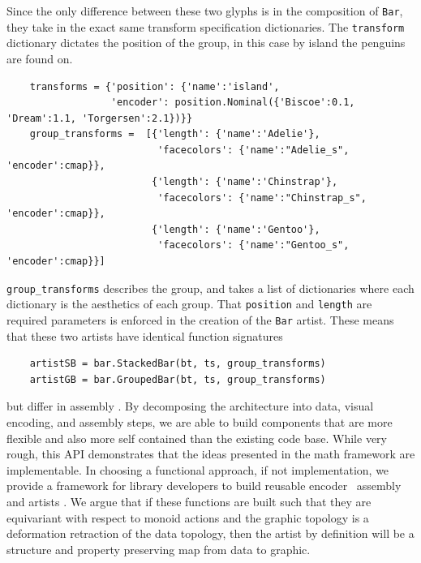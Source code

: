 \documentclass[../main.tex]{subfiles}
\begin{document}
Since the only difference between these two glyphs is in the composition of \texttt{Bar}, they take in the exact same transform specification dictionaries. The \texttt{transform} dictionary dictates the position of the group, in this case by island the penguins are found on.

\begin{verbatim}
    transforms = {'position': {'name':'island',
                  'encoder': position.Nominal({'Biscoe':0.1, 'Dream':1.1, 'Torgersen':2.1})}} 
    group_transforms =  [{'length': {'name':'Adelie'},
                          'facecolors': {'name':"Adelie_s", 'encoder':cmap}},
                         {'length': {'name':'Chinstrap'},
                          'facecolors': {'name':"Chinstrap_s", 'encoder':cmap}}, 
                         {'length': {'name':'Gentoo'},
                          'facecolors': {'name':"Gentoo_s", 'encoder':cmap}}]
    \end{verbatim}
    \texttt{group_transforms} describes the group, and takes a list of dictionaries where each dictionary is the aesthetics of each group. That \texttt{position} and \texttt{length} are required parameters is enforced in the creation of the \texttt{Bar} artist. These means that these two artists have identical function signatures
    
    \begin{verbatim}
    artistSB = bar.StackedBar(bt, ts, group_transforms)
    artistGB = bar.GroupedBar(bt, ts, group_transforms)
    \end{verbatim}
    
    but differ in assembly \vmarkd. By decomposing the architecture into data, visual encoding, and assembly steps, we are able to build components that are more flexible and also more self contained than the existing code base. While very rough, this API demonstrates that the ideas presented in the math framework are implementable. In choosing a functional approach, if not implementation, we provide a framework for library developers to build reusable encoder \vchannel\, assembly \vmarkd and artists \vartist. We argue that  if these functions are built such that they are equivariant with respect to monoid actions and the graphic topology is a deformation retraction of the data topology, then the artist by definition will be a structure and property preserving map from data to graphic. 
    
\end{document}

